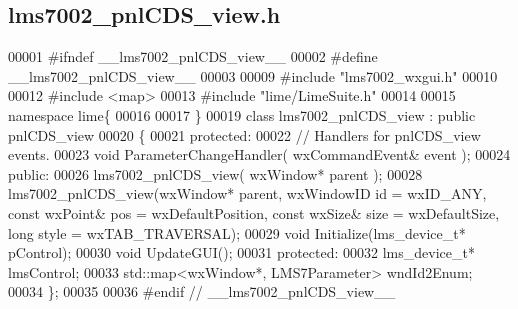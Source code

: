 \subsection{lms7002\+\_\+pnl\+C\+D\+S\+\_\+view.\+h}
\label{lms7002__pnlCDS__view_8h_source}

\begin{DoxyCode}
00001 \textcolor{preprocessor}{#ifndef \_\_lms7002\_pnlCDS\_view\_\_}
00002 \textcolor{preprocessor}{#define \_\_lms7002\_pnlCDS\_view\_\_}
00003 
00009 \textcolor{preprocessor}{#include "lms7002_wxgui.h"}
00010 
00012 \textcolor{preprocessor}{#include <map>}
00013 \textcolor{preprocessor}{#include "lime/LimeSuite.h"}
00014 
00015 \textcolor{keyword}{namespace }lime\{
00016 
00017 \}
00019 \textcolor{keyword}{class }lms7002_pnlCDS_view : \textcolor{keyword}{public} pnlCDS_view
00020 \{
00021     \textcolor{keyword}{protected}:
00022         \textcolor{comment}{// Handlers for pnlCDS\_view events.}
00023         \textcolor{keywordtype}{void} ParameterChangeHandler( wxCommandEvent& event );
00024     \textcolor{keyword}{public}:
00026         lms7002_pnlCDS_view( wxWindow* parent );
00028     lms7002_pnlCDS_view(wxWindow* parent, wxWindowID \textcolor{keywordtype}{id} = wxID\_ANY, \textcolor{keyword}{const} wxPoint& pos = wxDefaultPosition,
       \textcolor{keyword}{const} wxSize& size = wxDefaultSize, \textcolor{keywordtype}{long} style = wxTAB\_TRAVERSAL);
00029     \textcolor{keywordtype}{void} Initialize(lms_device_t* pControl);
00030     \textcolor{keywordtype}{void} UpdateGUI();
00031 \textcolor{keyword}{protected}:
00032     lms_device_t* lmsControl;
00033     std::map<wxWindow*, LMS7Parameter> wndId2Enum;
00034 \};
00035 
00036 \textcolor{preprocessor}{#endif // \_\_lms7002\_pnlCDS\_view\_\_}
\end{DoxyCode}
